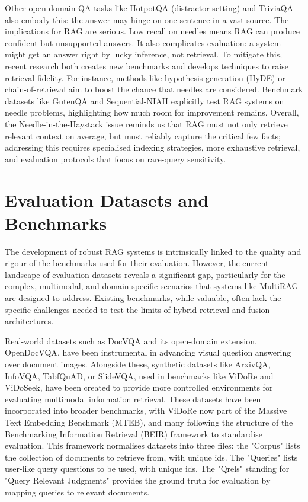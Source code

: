 \documentclass[12pt,twoside]{report}
\begin{document}
Other open-domain QA tasks like HotpotQA\cite{HotpotQA} (distractor setting) and TriviaQA\cite{TriviaQA} also embody this: the answer may hinge on one sentence in a vast source. The implications for RAG are serious. Low recall on needles means RAG can produce confident but unsupported answers. It also complicates evaluation: a system might get an answer right by lucky inference, not retrieval. To mitigate this, recent research both creates new benchmarks and develops techniques to raise retrieval fidelity. For instance, methods like hypothesis-generation (HyDE) or chain-of-retrieval aim to boost the chance that needles are considered. Benchmark datasets like GutenQA and Sequential-NIAH explicitly test RAG systems on needle problems, highlighting how much room for improvement remains. Overall, the Needle-in-the-Haystack issue reminds us that RAG must not only retrieve relevant context on average, but must reliably capture the critical few facts; addressing this requires specialised indexing strategies, more exhaustive retrieval, and evaluation protocols that focus on rare-query sensitivity.


\section{Evaluation Datasets and Benchmarks}

The development of robust RAG systems is intrinsically linked to the quality and rigour of the benchmarks used for their evaluation. However, the current landscape of evaluation datasets reveals a significant gap, particularly for the complex, multimodal, and domain-specific scenarios that systems like MultiRAG are designed to address. Existing benchmarks, while valuable, often lack the specific challenges needed to test the limits of hybrid retrieval and fusion architectures.

Real-world datasets such as DocVQA\cite{DocVQA} and its open-domain extension, OpenDocVQA\cite{OpenDocVQA}, have been instrumental in advancing visual question answering over document images. Alongside these, synthetic datasets like ArxivQA\cite{ArXivQA}, InfoVQA\cite{InfoVQA}, TabfQuAD\cite{ColPali}, or SlideVQA\cite{SlideVQA}, used in benchmarks like ViDoRe\cite{ColPali} and ViDoSeek\cite{VidoRAG}, have been created to provide more controlled environments for evaluating multimodal information retrieval. These datasets have been incorporated into broader benchmarks, with ViDoRe now part of the Massive Text Embedding Benchmark (MTEB)\cite{MTEB_Paper}, and many following the structure of the Benchmarking Information Retrieval (BEIR) framework\cite{BEIR_Framework} to standardise evaluation. This framework normalises datasets into three files: the "Corpus" lists the collection of documents to retrieve from, with unique ids. The "Queries" lists user-like query questions to be used, with unique ids. The "Qrels" standing for "Query Relevant Judgments" provides the ground truth for evaluation by mapping queries to relevant documents.
\end{document}
